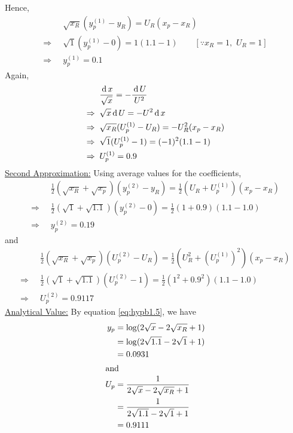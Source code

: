 \documentclass[../main-sheet.tex]{subfiles}
\begin{document}
\begin{soln}
\begin{center}
    \end{center}
    Hence,
    \begin{align*}
        &\sqrt{x_R}(y_p^{(1)}-y_R)=U_R(x_p-x_R)\\
        \Rightarrow\;\;&\sqrt{1}(y_p^{(1)}-0)=1(1.1-1)\qquad [\because x_R=1,\,\,U_R=1]\\
        \Rightarrow\;\;&y_p^{(1)}=0.1
    \end{align*}
    Again,
    \begin{align*}
        &\frac{\,\mathrm{d}\, x}{\sqrt{x}}=-\frac{\,\mathrm{d}\, U}{U^2}\\
        \Rightarrow\;\;&{\sqrt{x}}\,\mathrm{d}\, U=-U^2\,\mathrm{d}\, x\\
        \Rightarrow\;\;&\sqrt{x_R}(U_p^{(1)}-U_R)=-U_R^2(x_p-x_R)\\
        \Rightarrow\;\;&\sqrt{1}(U_p^{(1)}-1)=(-1)^2(1.1-1)\\
        \Rightarrow\;\;&U_p^{(1)}=0.9
    \end{align*}
    \underline{Second Approximation:} Using average values for the coefficients,
    \begin{align*}
        &\frac{1}{2}\left( \sqrt{x_R}+\sqrt{x_p} \right)\left( y_p^{(2)}-y_R \right)=\frac{1}{2}\left( U_R+U_p^{(1)} \right)\left( x_p-x_R \right)\\
        \Rightarrow\;\;&\frac{1}{2}\left( \sqrt{1}+\sqrt{1.1} \right)\left( y_p^{(2)}-0 \right)=\frac{1}{2}\left( 1+0.9\right)\left( 1.1-1.0 \right)\\
        \Rightarrow\;\;& y_p^{(2)}=0.19
    \end{align*}
    and 
    \begin{align*}
        &\frac{1}{2}\left( \sqrt{x_R}+\sqrt{x_p} \right)\left( U_p^{(2)}-U_R \right)=\frac{1}{2}\left( U_R^2+(U_p^{(1)})^2 \right)\left( x_p-x_R \right)\\
        \Rightarrow\;\;&\frac{1}{2}\left( \sqrt{1}+\sqrt{1.1} \right)\left( U_p^{(2)}-1 \right)=\frac{1}{2}\left( 1^2+0.9^2\right)\left( 1.1-1.0 \right)\\
        \Rightarrow\;\;& U_p^{(2)}=0.9117
    \end{align*}
    \underline{Analytical Value:} By equation \eqref{eq:hypb1.5}, we have
    \begin{align*}
        y_p&=\log (2\sqrt{x}-2\sqrt{x_R}+1)\\
        &=\log (2\sqrt{1.1}-2\sqrt{1}+1)\\
        &=0.0931\\
        \intertext{and }
        U_p&=\frac{1}{2\sqrt{x}-2\sqrt{x_R}+1}\\
        &=\frac{1}{2\sqrt{1.1}-2\sqrt{1}+1}\\
        &=0.9111
    \end{align*}
\end{soln}
\end{document}
